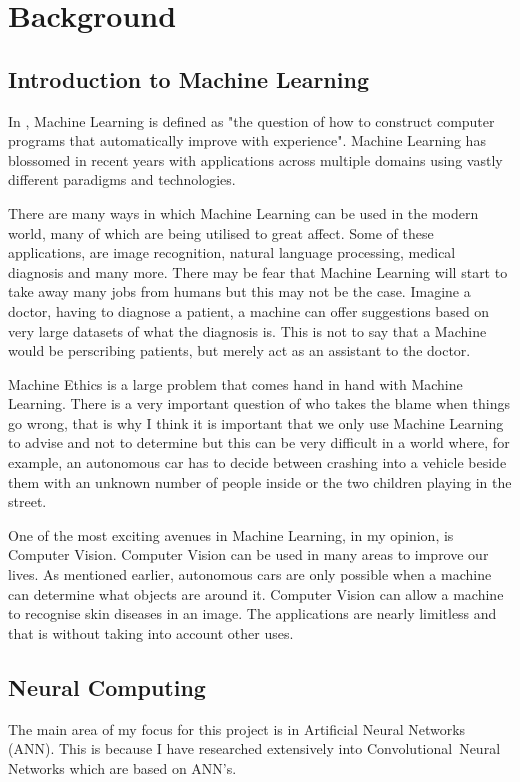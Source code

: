 \chapter{Background}
\label{background}

\section{Introduction to Machine Learning}
In \textcite{MLANN}, Machine Learning is defined as "the question of how to
construct computer programs that automatically improve with experience".
Machine Learning has blossomed in recent years with applications across multiple
domains using vastly different paradigms and technologies.

There are many ways in which Machine Learning can be used in the modern world,
many of which are being utilised to great affect.
Some of these applications, are image recognition, natural language processing,
medical diagnosis and many more.
There may be fear that Machine Learning will start to take away many jobs from
humans but this may not be the case. Imagine a doctor, having to diagnose a
patient, a machine can offer suggestions based on very large datasets of what
the diagnosis is. This is not to say that a Machine would be
perscribing patients, but merely act as an assistant to the doctor.

Machine Ethics is a large problem that comes hand in hand with Machine Learning.
There is a very important question of who takes the blame when things go wrong,
that is why I think it is important that we only use Machine Learning to advise
and not to determine but this can be very difficult in a world where, for
example, an autonomous car has to decide between crashing into a vehicle beside
them with an unknown number of people inside or the two children playing in the
street.

One of the most exciting avenues in Machine Learning, in my opinion, is Computer
Vision. Computer Vision can be used in many areas to improve our lives. As
mentioned earlier, autonomous cars are only possible when a machine can
determine what objects are around it. Computer Vision can allow a machine to
recognise skin diseases in an image. The applications are nearly limitless and
that is without taking into account other uses.

\section{Neural Computing}
The main area of my focus for this project is in
Artificial Neural Networks (ANN). This is because I have researched extensively into Convolutional Neural Networks which are based on ANN's.
